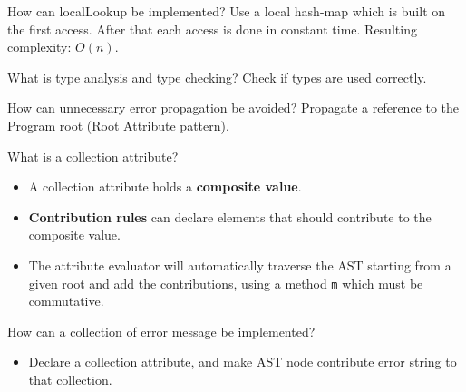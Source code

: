 \documentclass[11pt]{beamer}
\begin{document}
\begin{frame}
\begin{block}{How can localLookup be implemented? }
Use a local hash-map which is built on the first access. After that each access is done in constant time. Resulting complexity: $O(n)$.
\end{block}
\end{frame}

\begin{frame}

\begin{block}{What is type analysis and type checking? }
Check if types are used correctly.
\end{block}



\begin{block}{How can unnecessary error propagation be avoided? }
Propagate a reference to the Program root (Root Attribute pattern).
\end{block}


\begin{block}{What is a collection attribute? }
\begin{itemize}
\item A collection attribute holds a \textbf{composite value}.
\item \textbf{Contribution rules} can declare elements that should contribute to the composite value.
\item The attribute evaluator will automatically traverse the AST starting from a given root and add the contributions, using a method \texttt{m} which must be commutative.
\end{itemize}
\end{block}


\end{frame}

\begin{frame}
\begin{block}{How can a collection of error message be implemented? }

\begin{itemize}
\item Declare a collection attribute, and make AST node contribute error string to that collection.
\end{itemize}

\end{block}
\end{frame}
\end{document}
